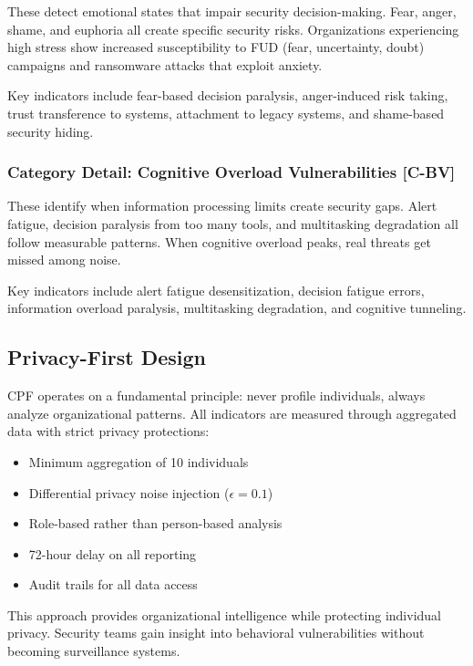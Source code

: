 \documentclass[11pt,a4paper]{article}
\begin{document}
These detect emotional states that impair security decision-making. Fear, anger, shame, and euphoria all create specific security risks. Organizations experiencing high stress show increased susceptibility to FUD (fear, uncertainty, doubt) campaigns and ransomware attacks that exploit anxiety.

Key indicators include fear-based decision paralysis, anger-induced risk taking, trust transference to systems, attachment to legacy systems, and shame-based security hiding.

\subsubsection{Category Detail: Cognitive Overload Vulnerabilities [C-BV]}

These identify when information processing limits create security gaps. Alert fatigue, decision paralysis from too many tools, and multitasking degradation all follow measurable patterns. When cognitive overload peaks, real threats get missed among noise.

Key indicators include alert fatigue desensitization, decision fatigue errors, information overload paralysis, multitasking degradation, and cognitive tunneling.

\subsection{Privacy-First Design}

CPF operates on a fundamental principle: never profile individuals, always analyze organizational patterns. All indicators are measured through aggregated data with strict privacy protections:

\begin{itemize}
\item Minimum aggregation of 10 individuals
\item Differential privacy noise injection ($\epsilon = 0.1$)
\item Role-based rather than person-based analysis
\item 72-hour delay on all reporting
\item Audit trails for all data access
\end{itemize}

This approach provides organizational intelligence while protecting individual privacy. Security teams gain insight into behavioral vulnerabilities without becoming surveillance systems.
\end{document}
